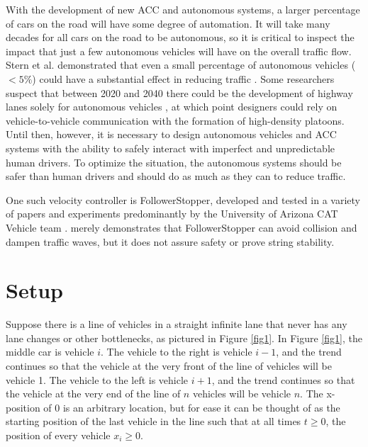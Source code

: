\documentclass[conference]{IEEEtran}
\begin{document}
With the development of new ACC and autonomous systems, a larger percentage of cars on the road will have some degree of automation. It will take many decades for all cars on the road to be autonomous, so it is critical to inspect the impact that just a few autonomous vehicles will have on the overall traffic flow. Stern et al. demonstrated that even a small percentage of autonomous vehicles ($<5\%$) could have a substantial effect in reducing traffic \cite{Stern}. Some researchers suspect that between 2020 and 2040 there could be the development of highway lanes solely for autonomous vehicles \cite{Litman}, at which point designers could rely on vehicle-to-vehicle communication with the formation of high-density platoons. Until then, however, it is necessary to design autonomous vehicles and ACC systems with the ability to safely interact with imperfect and unpredictable human drivers. To optimize the situation, the autonomous systems should be safer than human drivers and should do as much as they can to reduce traffic.

One such velocity controller is FollowerStopper, developed and tested in a variety of papers and experiments predominantly by the University of Arizona CAT Vehicle team \cite{Stern, Real-time, Supervisory}. \cite{Supervisory} merely demonstrates that FollowerStopper can avoid collision and dampen traffic waves, but it does not assure safety or prove string stability.





\section{Setup}
Suppose there is a line of vehicles in a straight infinite lane that never has any lane changes or other bottlenecks, as pictured in Figure \ref{fig1}. In Figure \ref{fig1}, the middle car is vehicle $i$. The vehicle to the right is vehicle $i-1$, and the trend continues so that the vehicle at the very front of the line of vehicles will be vehicle 1. The vehicle to the left is vehicle $i+1$, and the trend continues so that the vehicle at the very end of the line of $n$ vehicles will be vehicle $n$. The x-position of 0 is an arbitrary location, but for ease it can be thought of as the starting position of the last vehicle in the line such that at all times $t\geq 0$, the position of every vehicle $x_i\geq 0$.
\end{document}

